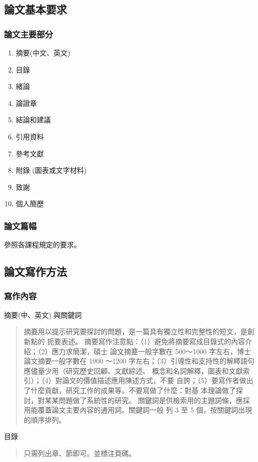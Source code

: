 \documentclass[
    writingLanguage=chinese, %
    addPageTitle=on,  %
    addDeclaration=on, %
    addMUSTlogo=on, %
    addFigTOC=on, %
    addTabTOC=on, %
    refIndent=off, %
    printMod=off, %
]{.def/must}
\begin{document}
\subsection{論文基本要求}
\subsubsection{論文主要部分}

\begin{enumerate}
    \item 摘要(中文、英文)
    \item 目錄
    \item 緒論
    \item 論證章
    \item 結論和建議
    \item 引用資料
    \item 參考文獻
    \item 附錄 (圖表或文字材料)
    \item 致謝
    \item 個人簡歷
\end{enumerate}

\subsubsection{論文篇幅}
參照各課程規定的要求。

\subsection{論文寫作方法}
\subsubsection{寫作內容}
\noindent\faHandORight 摘要(中、英文) 與關鍵詞
\begin{quote}
摘要用以提示研究要探討的問題，是一篇具有獨立性和完整性的短文，是創新點的
扼要表述。
摘要寫作注意點：（1）避免將摘要寫成目錄式的內容介紹；（2）應力求簡潔，碩士
論文摘要一般字數在 500～1000 字左右，博士論文摘要一般字數在 1000 ～1200
字左右；（3）引導性和支持性的解釋語句應儘量少用（研究歷史回顧、文獻綜述、
概念和名詞解釋，圖表和文獻索引）；（4）對論文的價值描述應用陳述方式，不要
自誇；（5）要寫作者做出了什麼貢獻，研究工作的成果等。不要寫做了什麼：對基
本理論做了探討，對某某問題做了系統性的研究。
關鍵詞是供檢索用的主題詞條，應採用能覆蓋論文主要內容的通用詞。關鍵詞一般
列 3 至 5 個，按關鍵詞出現的順序排列。
\end{quote}


\noindent\faHandORight 目錄
\begin{quote}
 只需列出章、節即可。並標注頁碼。
    
\end{quote}
\end{document}
